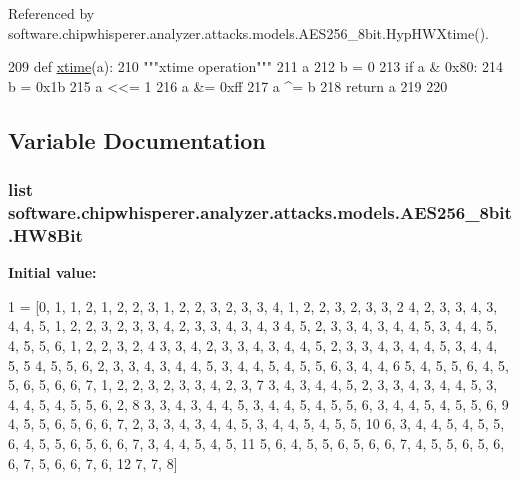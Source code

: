 Referenced by software.\+chipwhisperer.\+analyzer.\+attacks.\+models.\+A\+E\+S256\+\_\+8bit.\+Hyp\+H\+W\+Xtime().


\begin{DoxyCode}
209 \textcolor{keyword}{def }\hyperlink{namespacesoftware_1_1chipwhisperer_1_1analyzer_1_1attacks_1_1models_1_1AES256__8bit_a096a7aee640b9fd3b4af6bd8e2bdb892}{xtime}(a):
210     \textcolor{stringliteral}{"""xtime operation"""}
211     a %
212     b = 0
213     \textcolor{keywordflow}{if} a & 0x80:
214         b = 0x1b
215     a <<= 1
216     a &= 0xff
217     a ^= b
218     \textcolor{keywordflow}{return} a
219 
220 
\end{DoxyCode}


\subsection{Variable Documentation}
\hypertarget{namespacesoftware_1_1chipwhisperer_1_1analyzer_1_1attacks_1_1models_1_1AES256__8bit_ad6337890aed03cf6136448998f509669}{}
\subsubsection[{H\+W8\+Bit}]{\setlength{\rightskip}{0pt plus 5cm}list software.\+chipwhisperer.\+analyzer.\+attacks.\+models.\+A\+E\+S256\+\_\+8bit.\+H\+W8\+Bit}\label{namespacesoftware_1_1chipwhisperer_1_1analyzer_1_1attacks_1_1models_1_1AES256__8bit_ad6337890aed03cf6136448998f509669}
{\bfseries Initial value\+:}
\begin{DoxyCode}
1 = [0, 1, 1, 2, 1, 2, 2, 3, 1, 2, 2, 3, 2, 3, 3, 4, 1, 2, 2, 3, 2, 3, 3,
2           4, 2, 3, 3, 4, 3, 4, 4, 5, 1, 2, 2, 3, 2, 3, 3, 4, 2, 3, 3, 4, 3, 4,
3           4, 5, 2, 3, 3, 4, 3, 4, 4, 5, 3, 4, 4, 5, 4, 5, 5, 6, 1, 2, 2, 3, 2,
4           3, 3, 4, 2, 3, 3, 4, 3, 4, 4, 5, 2, 3, 3, 4, 3, 4, 4, 5, 3, 4, 4, 5,
5           4, 5, 5, 6, 2, 3, 3, 4, 3, 4, 4, 5, 3, 4, 4, 5, 4, 5, 5, 6, 3, 4, 4,
6           5, 4, 5, 5, 6, 4, 5, 5, 6, 5, 6, 6, 7, 1, 2, 2, 3, 2, 3, 3, 4, 2, 3,
7           3, 4, 3, 4, 4, 5, 2, 3, 3, 4, 3, 4, 4, 5, 3, 4, 4, 5, 4, 5, 5, 6, 2,
8           3, 3, 4, 3, 4, 4, 5, 3, 4, 4, 5, 4, 5, 5, 6, 3, 4, 4, 5, 4, 5, 5, 6,
9           4, 5, 5, 6, 5, 6, 6, 7, 2, 3, 3, 4, 3, 4, 4, 5, 3, 4, 4, 5, 4, 5, 5,
10           6, 3, 4, 4, 5, 4, 5, 5, 6, 4, 5, 5, 6, 5, 6, 6, 7, 3, 4, 4, 5, 4, 5,
11           5, 6, 4, 5, 5, 6, 5, 6, 6, 7, 4, 5, 5, 6, 5, 6, 6, 7, 5, 6, 6, 7, 6,
12           7, 7, 8]
\end{DoxyCode}



